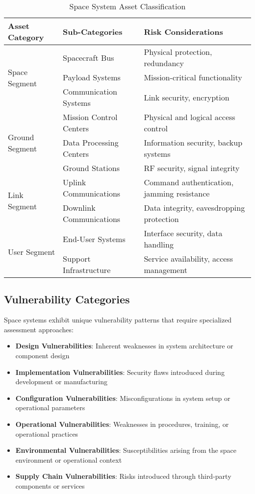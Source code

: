 \documentclass[binding=0.6cm]{sapthesis}
\begin{document}
\begin{table}[H]
\centering
\caption{Space System Asset Classification}
\begin{tabular}{|l|l|l|}
\hline
\textbf{Asset Category} & \textbf{Sub-Categories} & \textbf{Risk Considerations} \\ \hline
\multirow{3}{*}{Space Segment} & Spacecraft Bus & Physical protection, redundancy \\ \cline{2-3}
& Payload Systems & Mission-critical functionality \\ \cline{2-3}
& Communication Systems & Link security, encryption \\ \hline
\multirow{3}{*}{Ground Segment} & Mission Control Centers & Physical and logical access control \\ \cline{2-3}
& Data Processing Centers & Information security, backup systems \\ \cline{2-3}
& Ground Stations & RF security, signal integrity \\ \hline
\multirow{2}{*}{Link Segment} & Uplink Communications & Command authentication, jamming resistance \\ \cline{2-3}
& Downlink Communications & Data integrity, eavesdropping protection \\ \hline
\multirow{2}{*}{User Segment} & End-User Systems & Interface security, data handling \\ \cline{2-3}
& Support Infrastructure & Service availability, access management \\ \hline
\end{tabular}
\end{table}

\subsection{Vulnerability Categories}

Space systems exhibit unique vulnerability patterns that require specialized assessment approaches:

\begin{itemize}
    \item \textbf{Design Vulnerabilities}: Inherent weaknesses in system architecture or component design
    \item \textbf{Implementation Vulnerabilities}: Security flaws introduced during development or manufacturing
    \item \textbf{Configuration Vulnerabilities}: Misconfigurations in system setup or operational parameters
    \item \textbf{Operational Vulnerabilities}: Weaknesses in procedures, training, or operational practices
    \item \textbf{Environmental Vulnerabilities}: Susceptibilities arising from the space environment or operational context
    \item \textbf{Supply Chain Vulnerabilities}: Risks introduced through third-party components or services
\end{itemize}
\end{document}
